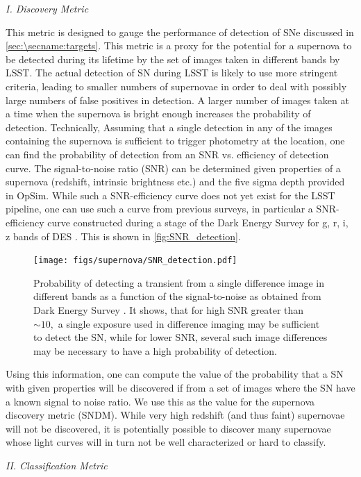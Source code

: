 \emph{I. Discovery Metric}

This metric is designed to gauge the performance of detection of SNe
discussed in \autoref{sec:\secname:targets}.
This metric is a proxy for the potential for a supernova to be detected
 during its lifetime by the set of images taken in different bands by LSST. The actual
 detection of SN during LSST is likely to use more stringent criteria, leading to 
 smaller numbers of supernovae in order to deal with possibly large numbers of false positives in detection. A larger
 number of images taken at a time when the supernova is bright enough increases the
 probability of detection. Technically, Assuming that a single detection in any of the images containing
 the supernova is sufficient to trigger photometry at the location, one can find the
 probability of detection from an SNR vs. efficiency of detection curve. The signal-to-noise ratio
(SNR) can be determined given properties of a supernova (redshift, intrinsic brightness etc.)
 and the five sigma depth provided in OpSim. While such a SNR-efficiency curve does not
 yet exist for the LSST pipeline, one can use such a curve from previous surveys, in particular a
 SNR-efficiency curve constructed during a stage of the Dark Energy Survey for g, r, i, z bands of DES
 \citep{Kessler2015}. This is shown in \autoref{fig:SNR_detection}.
\begin{figure}
 \centering
 \texttt{[image: figs/supernova/SNR\_detection.pdf]}
 \caption{Probability of detecting a transient from a single difference image in different bands as
a
 function of the signal-to-noise as obtained from Dark Energy Survey \citep{Kessler2015}. It shows,
that
for high SNR greater than $\sim 10,$ a single exposure used in difference imaging may be sufficient to detect the SN, while for
lower SNR, several such image differences may be necessary to have a high probability of
detection.}
 \label{fig:SNR_detection}
\end{figure}

Using this information, one can compute the value of the probability that a SN with given properties
will be discovered if from a set of images where the SN have a known signal to noise ratio. We use this as the
value for the supernova discovery metric (SNDM). While very high redshift (and thus faint)
supernovae will not be discovered, it is
potentially possible to discover many supernovae whose light curves will in turn not be well
characterized or hard to classify.


\emph{II. Classification Metric}


